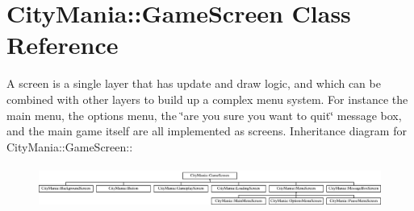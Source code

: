 \hypertarget{classCityMania_1_1GameScreen}{
\section{CityMania::GameScreen Class Reference}
\label{classCityMania_1_1GameScreen}
}


A screen is a single layer that has update and draw logic, and which can be combined with other layers to build up a complex menu system. For instance the main menu, the options menu, the \char`\"{}are you sure you
        want to quit\char`\"{} message box, and the main game itself are all implemented as screens.  
Inheritance diagram for CityMania::GameScreen::\begin{figure}[H]
\begin{center}
\leavevmode
\includegraphics[height=1.40704cm]{classCityMania_1_1GameScreen}
\end{center}
\end{figure}
